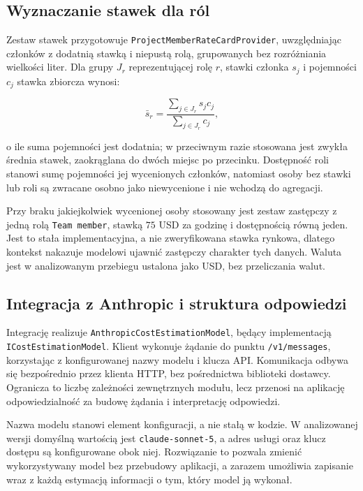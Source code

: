 \subsection{Wyznaczanie stawek dla ról}

Zestaw stawek przygotowuje \texttt{ProjectMemberRateCardProvider}, uwzględniając członków z dodatnią stawką i niepustą rolą, grupowanych bez rozróżniania wielkości liter. Dla grupy \(J_r\) reprezentującej rolę \(r\), stawki członka \(s_j\) i pojemności \(c_j\) stawka zbiorcza wynosi:

\begin{equation}
    \bar{s}_r =
    \frac{\sum_{j\in J_r}s_jc_j}
         {\sum_{j\in J_r}c_j},
    \label{eq:koszt-stawka-roli}
\end{equation}

o ile suma pojemności jest dodatnia; w przeciwnym razie stosowana jest zwykła średnia stawek, zaokrąglana do dwóch miejsc po przecinku. Dostępność roli stanowi sumę pojemności jej wycenionych członków, natomiast osoby bez stawki lub roli są zwracane osobno jako niewycenione i nie wchodzą do agregacji.

Przy braku jakiejkolwiek wycenionej osoby stosowany jest zestaw zastępczy z jedną rolą \texttt{Team member}, stawką \(75\) USD za godzinę i dostępnością równą jeden. Jest to stała implementacyjna, a nie zweryfikowana stawka rynkowa, dlatego kontekst nakazuje modelowi ujawnić zastępczy charakter tych danych. Waluta jest w analizowanym przebiegu ustalona jako USD, bez przeliczania walut.

\subsection{Integracja z Anthropic i struktura odpowiedzi}

Integrację realizuje \texttt{AnthropicCostEstimationModel}, będący implementacją \texttt{ICostEstimationModel}. Klient wykonuje żądanie do punktu \texttt{/v1/messages}, korzystając z konfigurowanej nazwy modelu i klucza API. Komunikacja odbywa się bezpośrednio przez klienta HTTP, bez pośrednictwa biblioteki dostawcy. Ogranicza to liczbę zależności zewnętrznych modułu, lecz przenosi na aplikację odpowiedzialność za budowę żądania i interpretację odpowiedzi.

Nazwa modelu stanowi element konfiguracji, a nie stałą w kodzie. W analizowanej wersji domyślną wartością jest \texttt{claude-sonnet-5}, a adres usługi oraz klucz dostępu są konfigurowane obok niej. Rozwiązanie to pozwala zmienić wykorzystywany model bez przebudowy aplikacji, a zarazem umożliwia zapisanie wraz z każdą estymacją informacji o tym, który model ją wykonał.

